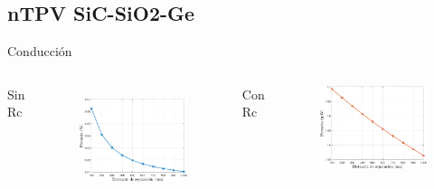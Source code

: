 \documentclass[spanish,a4paper]{beamer}%
\newcommand{\resCondPath}{\graphicspath{{./figuras/Resultados/conduccion/}}}
\begin{document}
	\subsection{nTPV SiC-SiO2-Ge}
	\begin{frame}{Conducción}
			\resCondPath
			\begin{columns}
						\begin{block}{\centering Sin Rc}
						\end{block}
					\vspace{15pt}
						\begin{figure}[h]%
								\centering
										\includegraphics[width=\columnwidth]{Pn_SiCSiO2Ge}
								\label{fig:SiCSiO2Ge_cond}%
						\end{figure}
						\vfill
					\vspace{-15pt}
						\begin{block}{\centering Con Rc}
							\end{block}
					\vspace{10pt}
						\begin{figure}[h]%
								\centering
										\includegraphics[width=\columnwidth]{Prc_SiCSiO2Ge}%

\end{figure}
\end{columns}
\end{frame}
\end{document}

